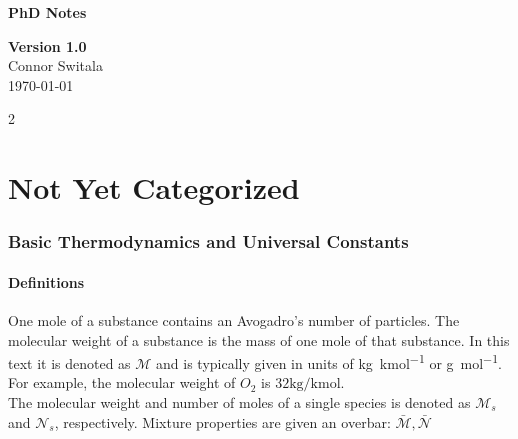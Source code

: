 \documentclass[10pt]{article}
\begin{document}
\begin{titlepage}
    \begin{center}
        \vspace{1cm}

        \Large
        \textbf{PhD Notes}
        \vspace{20mm}

        
        \vfill
        \Large
        \textbf{Version 1.0} 
        \\ Connor Switala
        \\
        \large        
        \today
        
    \end{center}
\end{titlepage}

\begin{flushleft}
\onehalfspacing
\tableofcontents
\newpage



\begin{multicols}{2}
    \printnomenclature
\end{multicols}




\newpage
\part{Not Yet Categorized}
\newpage
\section{Basic Thermodynamics and Universal Constants}

\subsection{Definitions}

\begin{definition}
One mole of a substance contains an Avogadro's number of particles. The molecular weight of a substance is the mass of one mole of that substance. In this text it is denoted as $\mathcal{M}$ and is typically given in units of \si{\kilo\gram\per\kilo\mole} or \si{\gram\per\mole}. For example, the molecular weight of $O_2$ is $32 \si{\kilo\gram\per\kilo\mole}$.
\vspace{5mm}
\\ The molecular weight and number of moles of a single species is denoted as $\mathcal{M}_s$ and $\mathcal{N}_s$, respectively. Mixture properties are given an overbar: $\bar{\mathcal{M}}, \bar{\mathcal{N}}$
\label{def:MW}
\end{definition}


\end{flushleft}
\end{document}
